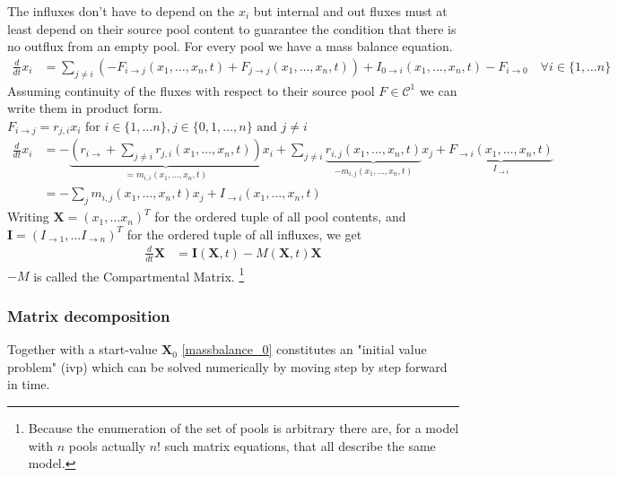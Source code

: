 \documentclass[journal abbreviation, manuscript]{copernicus}
\theoremstyle{definition}
\newcommand{\X}{\mathbf{X}}
\newcommand{\I}{\mathbf{I}}
\begin{document}
The influxes don't have to depend on the $x_i$  but internal and out fluxes must at least depend on their source pool content to guarantee the 
condition that there is no outflux from an empty pool. 
\newcommand{\xnt}{(x_1, \dots, x_n, t)}
For every pool we have a mass balance equation.
\begin{align}
  \frac{d}{d t} x_i 
    &= 
    \sum_{j\ne i} (-F_{i\rightarrow j}\xnt
    +F_{j\rightarrow j}\xnt ) 
    + I_{0 \rightarrow i}\xnt 
    - F_{i \rightarrow 0} \quad \forall i \in \{1,\dots n\}
\end{align}
Assuming continuity of the fluxes with respect to their source pool 
$F \in \mathcal C^1$ we can write them in product form. 
$F_{i \rightarrow j} = r_{j,i} x_i \text{ for } i \in \{1, \dots n\} , j \in \{ 0, 1,\dots ,n\} \text{ and } j \ne i $ 
\begin{align}
  \frac{d}{d t} x_i 
    &= - \underbrace{
      \left(
      r_{i \rightarrow } 
      + 
      \sum_{j \ne i} r_{j,i}\xnt
      \right)
      }_{=m_{i,i}\xnt}
      x_i
      +
      \sum_{j \ne i} \underbrace{r_{i,j}\xnt}_{- m_{i,j} \xnt } x_j
      +
      \underbrace{F_{\rightarrow i}\xnt}_{I_{\rightarrow i}}
    \\
    &= 
      -\sum_{j} m_{i,j}\xnt x_j + I_{\rightarrow i}\xnt
\end{align}
Writing 
$\X=(x_1,\dots x_n)^T$ for the ordered tuple of all pool contents, and $\I=(I_{\rightarrow 1},\dots I_{\rightarrow n})^T$ for the ordered tuple of all influxes, we get
\begin{align}
  \frac{d}{d t} \X &= \I(\X,t) - M(\X,t) \X \label{massbalance_0}
\end{align}
$-M$ is called the Compartmental Matrix. \footnote{Because the enumeration of the set of pools is arbitrary there are, for a model with $n$ pools actually $n!$ such matrix equations, that all describe the same model.}  

\subsubsection{Matrix decomposition} 
Together with a start-value $\X_0$ \eqref{massbalance_0}  constitutes an "initial value problem" (ivp) which can be solved numerically by moving step by step forward in time.

%
\end{document}
